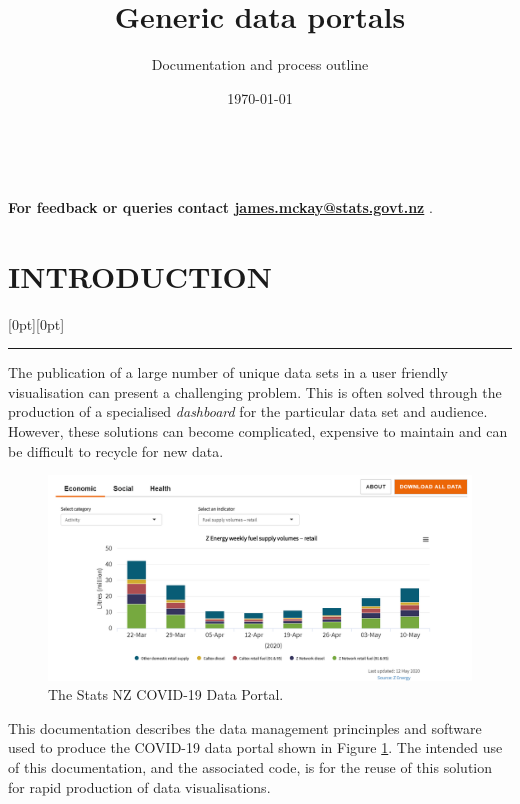 \documentclass[12pt]{article}
\title{Generic data portals}
\author{Documentation and process outline}
\date{\today}
\newcommand\statssection[1]{%
  \section*{\MakeUppercase{#1}}
  \raisebox{1.5em}[0pt][0pt]{\textcolor{statsorange}{\rule{0.2\textwidth}{6pt}}}
}
\begin{document}
\maketitle

\clearpage
\setcounter{page}{1}


{\center\vspace{1cm} \ \ }

{\center\textbf{For feedback or queries contact  \href{mailto:james.mckay@stats.govt.nz}{james.mckay@stats.govt.nz} }.}

\vspace{1cm}

\statssection{Introduction}

The publication of a large number of unique data sets in a user friendly visualisation can present a challenging problem.  This is often solved through the production of a specialised \textit{dashboard} for the particular data set and audience.  However, these solutions can become complicated, expensive to maintain and can be difficult to recycle for new data.




\vspace{0.5cm}

\begin{figure}[h]
\centering
\includegraphics[width=\textwidth]{figures/data_portal.png}
 	\caption{The Stats NZ COVID-19 Data Portal.}\label{fig:covid_19_portal}
\end{figure}
This documentation describes the data management princinples and software used to produce the COVID-19 data portal shown in Figure \ref{fig:covid_19_portal}.  The intended use of this documentation, and the associated code, is for the reuse of this solution for rapid production of data visualisations.
\end{document}
